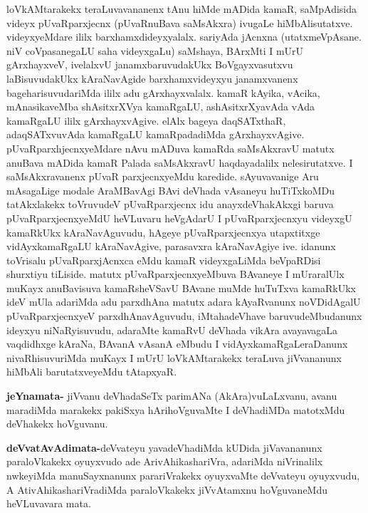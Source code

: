 \begin{artha}
loVkAMtarakekx teraLuvavananenx tAnu hiMde mADida kamaR, saMpAdisida videyx pUvaRparxjecnx (pUvaRnuBava saMsAkxra) ivugaLe hiMbAlisutatxve. videyxyeMdare ililx barxhamxdideyxyalalx. sariyAda jAcnxna (utatxmeVpAsane. niV coVpasanegaLU saha videyxgaLu) saMshaya, BArxMti I mUrU gArxhayxveV, ivelalxvU janamxbaruvudakUkx BoVgayxvasutxvu laBisuvudakUkx kAraNavAgide barxhamxvideyxyu janamxvanenx bageharisuvudariMda ililx adu gArxhayxvalalx.  kamaR kAyika, vAcika, mAnasikaveMba shAsitxrXVya kamaRgaLU, ashAsitxrXyavAda vAda kamaRgaLU ililx gArxhayxvAgive. elAlx bageya daqSATxthaR, adaqSATxvuvAda kamaRgaLU kamaRpadadiMda gArxhayxvAgive. pUvaRparxhjecnxyeMdare nAvu mADuva kamaRda saMsAkxravU matutx anuBava mADida kamaR Palada saMsAkxravU haqdayadalilx nelesirutatxve. I saMsAkxravanenx pUvaR parxjecnxyeMdu karedide. sAyuvavanige Aru mAsagaLige modale AraMBavAgi BAvi deVhada vAsaneyu huTiTxkoMDu tatAkxlakekx toVruvudeV pUvaRparxjecnx idu anayxdeVhakAkxgi baruva pUvaRparxjecnxyeMdU heVLuvaru heVgAdarU I pUvaRparxjecnxyu videyxgU kamaRkUkx kAraNavAguvudu, hAgeye pUvaRparxjecnxya utapxtitxge vidAyxkamaRgaLU kAraNavAgive, parasavxra kAraNavAgiye ive. idanunx toVrisalu pUvaRparxjAcnxca eMdu kamaR videyxgaLiMda beVpaRDisi shurxtiyu tiLiside. matutx pUvaRparxjecnxyeMbuva BAvaneye I mUraralUlx muKayx anuBavisuva kamaRsheVSavU BAvane muMde huTuTxva kamaRkUkx ideV mUla adariMda adu parxdhAna matutx adara kAyaRvanunx noVDidAgalU pUvaRparxjecnxyeV parxdhAnavAguvudu, iMtahadeVhave baruvudeMbudanunx ideyxyu niNaRyisuvudu, adaraMte kamaRvU deVhada vikAra avayavagaLa vaqdidhxge kAraNa, BAvanA vAsanA eMbudu I vidAyxkamaRgaLeraDanunx nivaRhisuvuriMda muKayx I mUrU loVkAMtarakekx teraLuva jiVvananunx hiMbAli barutatxveyeMdu tAtapxyaR.
\end{artha}



\begin{artha}
\textbf{jeYnamata-} jiVvanu deVhadaSeTx parimANa (AkAra)vuLaLxvanu, avanu maradiMda marakekx pakiSxya hArihoVguvaMte I deVhadiMDa matotxMdu deVhakekx hoVguvanu.
\end{artha}

\begin{artha}
\textbf{deVvatAvAdimata-}deVvateyu yavadeVhadiMda kUDida jiVavananunx paraloVkakekx oyuyxvudo ade ArivAhikashariVra, adariMda niVrinalilx nwkeyiMda manuSayxnanunx parariVrakekx oyuyxvaMte deVvateyu oyuyxvudu, A AtivAhikashariVradiMda paraloVkakekx jiVvAtamxnu hoVguvaneMdu heVLuvavara mata.
\end{artha}

